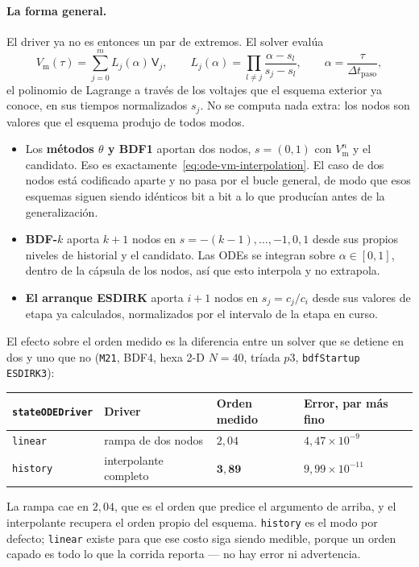 \documentclass[11pt,a4paper]{article}
\newcommand{\code}[1]{\texttt{\small #1}}
\newcommand{\Vm}{V_{\text{m}}}
\begin{document}
\paragraph{La forma general.} El driver ya no es entonces un par de extremos. El solver
evalúa
\begin{equation}
  \Vm(\tau) = \sum_{j=0}^{m} L_j(\alpha)\,\mathsf{V}_{j},
  \qquad
  L_j(\alpha)=\prod_{l\ne j}\frac{\alpha-s_l}{s_j-s_l},
  \qquad
  \alpha=\frac{\tau}{\Delta t_{\text{paso}}},
  \label{eq:ode-vm-lagrange}
\end{equation}
el polinomio de Lagrange a través de los voltajes que el esquema exterior ya conoce, en sus
tiempos normalizados $s_j$. No se computa nada extra: los nodos son valores que el esquema
produjo de todos modos.
\begin{itemize}
  \item Los \textbf{métodos $\theta$ y BDF1} aportan dos nodos, $s=(0,1)$ con $\Vm^n$ y el
        candidato. Eso es exactamente~\eqref{eq:ode-vm-interpolation}. El caso de dos nodos
        está codificado aparte y no pasa por el bucle general, de modo que esos esquemas
        siguen siendo idénticos bit a bit a lo que producían antes de la generalización.
  \item \textbf{BDF-$k$} aporta $k+1$ nodos en $s=-(k-1),\dots,-1,0,1$ desde sus propios
        niveles de historial y el candidato. Las ODEs se integran sobre $\alpha\in[0,1]$,
        dentro de la cápsula de los nodos, así que esto interpola y no extrapola.
  \item \textbf{El arranque ESDIRK} aporta $i+1$ nodos en $s_j=c_j/c_i$ desde sus valores de
        etapa ya calculados, normalizados por el intervalo de la etapa en curso.
\end{itemize}

El efecto sobre el orden medido es la diferencia entre un solver que se detiene en dos y uno
que no (\code{M21}, BDF4, hexa 2-D $N=40$, tríada $p3$, \code{bdfStartup ESDIRK3}):
\begin{center}
\begin{tabular}{@{}llll@{}}
\toprule
\code{stateODEDriver} & Driver & Orden medido & Error, par más fino \\
\midrule
\code{linear}  & rampa de dos nodos   & $2{,}04$ & $4{,}47\times10^{-9}$ \\
\code{history} & interpolante completo & $\mathbf{3{,}89}$ & $9{,}99\times10^{-11}$ \\
\bottomrule
\end{tabular}
\end{center}
La rampa cae en $2{,}04$, que es el orden que predice el argumento de arriba, y el
interpolante recupera el orden propio del esquema. \code{history} es el modo por defecto;
\code{linear} existe para que ese costo siga siendo medible, porque un orden capado es todo
lo que la corrida reporta --- no hay error ni advertencia.
\end{document}
